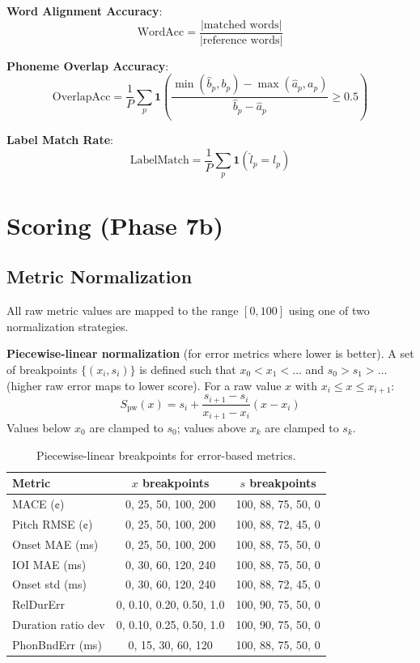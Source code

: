 \documentclass[11pt,letterpaper]{article}
\newcommand{\ah}{\hat{a}}
\newcommand{\bh}{\hat{b}}
\begin{document}
\textbf{Word Alignment Accuracy}:
\[
  \mathrm{WordAcc} = \frac{|\text{matched words}|}{|\text{reference words}|}
\]

\textbf{Phoneme Overlap Accuracy}:
\[
  \mathrm{OverlapAcc} = \frac{1}{P}\sum_p
    \mathbf{1}\!\left(\frac{\min(\bh_p,b_p)-\max(\ah_p,a_p)}
                           {\bh_p - \ah_p} \ge 0.5\right)
\]

\textbf{Label Match Rate}:
\[
  \mathrm{LabelMatch} = \frac{1}{P}\sum_p\mathbf{1}(\hat{l}_p = l_p)
\]

\section{Scoring (Phase 7b)}

\subsection{Metric Normalization}

All raw metric values are mapped to the range $[0, 100]$ using one of two
normalization strategies.

\textbf{Piecewise-linear normalization} (for error metrics where lower is
better).
A set of breakpoints $\{(x_i, s_i)\}$ is defined such that $x_0 < x_1 <
\ldots$ and $s_0 > s_1 > \ldots$
(higher raw error maps to lower score).
For a raw value $x$ with $x_i \le x \le x_{i+1}$:
\[
  S_\text{pw}(x) = s_i + \frac{s_{i+1}-s_i}{x_{i+1}-x_i}(x - x_i)
\]
Values below $x_0$ are clamped to $s_0$; values above $x_{k}$ are clamped
to $s_k$.

\begin{table}[h]
  \centering
  \caption{Piecewise-linear breakpoints for error-based metrics.}
  \renewcommand{\arraystretch}{1.2}
  \begin{tabular}{@{}lcc@{}}
    \toprule
    Metric & $x$ breakpoints & $s$ breakpoints \\
    \midrule
    MACE (¢)            & 0, 25, 50, 100, 200   & 100, 88, 75, 50, 0 \\
    Pitch RMSE (¢)      & 0, 25, 50, 100, 200   & 100, 88, 72, 45, 0 \\
    Onset MAE (ms)      & 0, 25, 50, 100, 200   & 100, 88, 75, 50, 0 \\
    IOI MAE (ms)        & 0, 30, 60, 120, 240   & 100, 88, 75, 50, 0 \\
    Onset std (ms)      & 0, 30, 60, 120, 240   & 100, 88, 72, 45, 0 \\
    RelDurErr           & 0, 0.10, 0.20, 0.50, 1.0 & 100, 90, 75, 50, 0 \\
    Duration ratio dev  & 0, 0.10, 0.25, 0.50, 1.0 & 100, 90, 75, 50, 0 \\
    PhonBndErr (ms)     & 0, 15, 30, 60, 120    & 100, 88, 75, 50, 0 \\
    \bottomrule
  \end{tabular}
\end{table}
\end{document}
